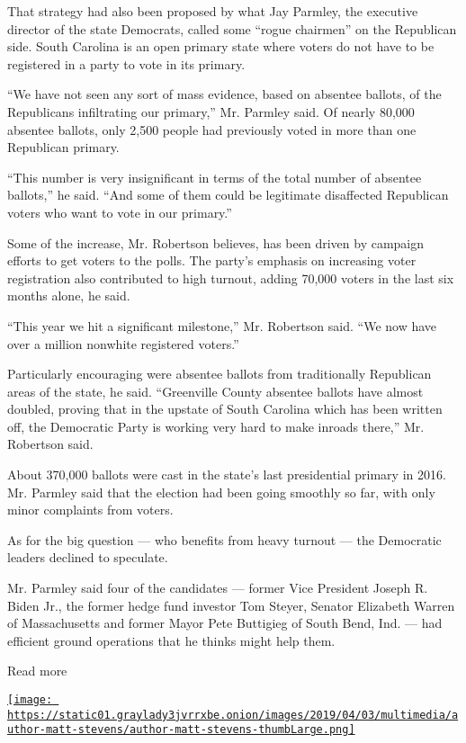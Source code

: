 That strategy had also been proposed by what Jay Parmley, the executive
director of the state Democrats, called some ``rogue chairmen'' on the
Republican side. South Carolina is an open primary state where voters do
not have to be registered in a party to vote in its primary.

``We have not seen any sort of mass evidence, based on absentee ballots,
of the Republicans infiltrating our primary,'' Mr. Parmley said. Of
nearly 80,000 absentee ballots, only 2,500 people had previously voted
in more than one Republican primary.

``This number is very insignificant in terms of the total number of
absentee ballots,'' he said. ``And some of them could be legitimate
disaffected Republican voters who want to vote in our primary.''

Some of the increase, Mr. Robertson believes, has been driven by
campaign efforts to get voters to the polls. The party's emphasis on
increasing voter registration also contributed to high turnout, adding
70,000 voters in the last six months alone, he said.

``This year we hit a significant milestone,'' Mr. Robertson said. ``We
now have over a million nonwhite registered voters.''

Particularly encouraging were absentee ballots from traditionally
Republican areas of the state, he said. ``Greenville County absentee
ballots have almost doubled, proving that in the upstate of South
Carolina which has been written off, the Democratic Party is working
very hard to make inroads there,'' Mr. Robertson said.

About 370,000 ballots were cast in the state's last presidential primary
in 2016. Mr. Parmley said that the election had been going smoothly so
far, with only minor complaints from voters.

As for the big question --- who benefits from heavy turnout --- the
Democratic leaders declined to speculate.

Mr. Parmley said four of the candidates --- former Vice President Joseph
R. Biden Jr., the former hedge fund investor Tom Steyer, Senator
Elizabeth Warren of Massachusetts and former Mayor Pete Buttigieg of
South Bend, Ind. --- had efficient ground operations that he thinks
might help them.

Read more

\href{https://www.nytimes3xbfgragh.onion/by/matt-stevens}{\texttt{[image: https://static01.graylady3jvrrxbe.onion/images/2019/04/03/multimedia/author-matt-stevens/author-matt-stevens-thumbLarge.png]}}

